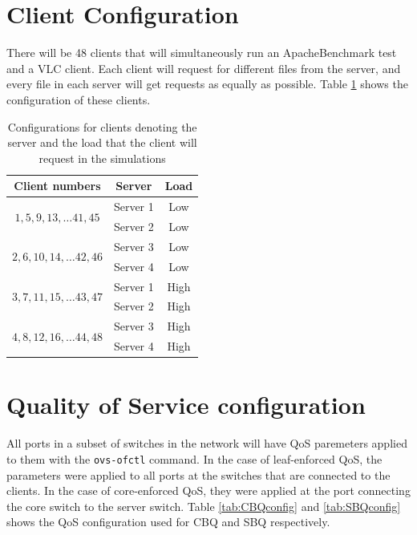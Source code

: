 \section{Client Configuration}
There will be 48 clients that will simultaneously run an ApacheBenchmark test and a VLC client. Each client will request for different files from the server, and every file in each server will get requests as equally as possible. Table \ref{tab:clientconfig} shows the configuration of these clients.

\begin{table}[htbp]
    \centering
    \begin{tabular}{ccc}
    \toprule
        Client numbers & Server & Load\\
    \midrule
        \multirow{2}{*}{$1, 5, 9, 13, \dots 41, 45$}  & Server 1 & Low \\
        & Server 2 & Low \\ \hline
        \multirow{2}{*}{$2, 6, 10, 14, \dots 42, 46$}  & Server 3 & Low \\
        & Server 4 & Low \\ \hline
        \multirow{2}{*}{$3, 7, 11, 15, \dots 43, 47$}  & Server 1 & High \\
        & Server 2 & High \\ \hline
        \multirow{2}{*}{$4, 8, 12, 16, \dots 44, 48$}  & Server 3 & High \\
        & Server 4 & High \\
    \bottomrule
    \end{tabular}
    \caption{Configurations for clients denoting the server and the load that the client will request in the simulations}
    \label{tab:clientconfig}
\end{table}

\section{Quality of Service configuration}
All ports in a subset of switches in the network will have QoS paremeters applied to them with the \texttt{ovs-ofctl} command. In the case of leaf-enforced QoS, the parameters were applied to all ports at the switches that are connected to the clients. In the case of core-enforced QoS, they were applied at the port connecting the core switch to the server switch. Table \ref{tab:CBQconfig} and \ref{tab:SBQconfig} shows the QoS configuration used for CBQ and SBQ respectively.

